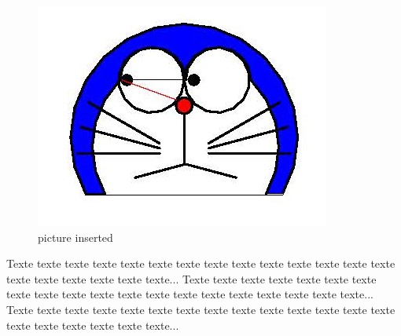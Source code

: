 \documentclass{article}
\begin{document}
\begin{figure}%
\centering
\includegraphics[scale=.3]{doraemon1.jpg}
\caption{picture inserted}
\end{figure}
Texte texte texte texte texte texte texte
texte texte texte texte texte texte texte
texte texte texte texte texte texte...
Texte texte texte texte texte texte texte
texte texte texte texte texte texte texte
texte texte texte texte texte texte...
Texte texte texte texte texte texte texte
texte texte texte texte texte texte texte
texte texte texte texte texte texte...


\clearpage
\listoffigures
\end{document}
